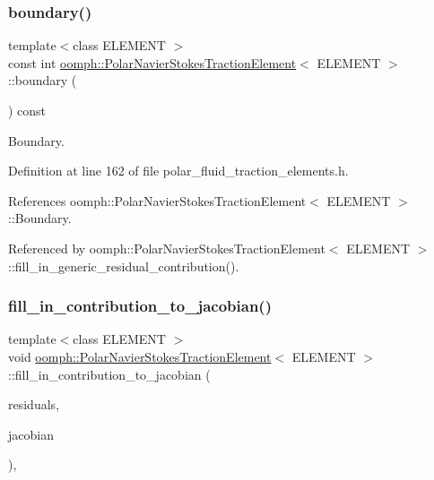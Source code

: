 \subsubsection{\texorpdfstring{boundary()}{boundary()}}
{\footnotesize\ttfamily template$<$class E\+L\+E\+M\+E\+NT $>$ \\
const int \hyperlink{classoomph_1_1PolarNavierStokesTractionElement}{oomph\+::\+Polar\+Navier\+Stokes\+Traction\+Element}$<$ E\+L\+E\+M\+E\+NT $>$\+::boundary (\begin{DoxyParamCaption}{ }\end{DoxyParamCaption}) const\hspace{0.3cm}{\ttfamily [inline]}}



Boundary. 



Definition at line 162 of file polar\+\_\+fluid\+\_\+traction\+\_\+elements.\+h.



References oomph\+::\+Polar\+Navier\+Stokes\+Traction\+Element$<$ E\+L\+E\+M\+E\+N\+T $>$\+::\+Boundary.



Referenced by oomph\+::\+Polar\+Navier\+Stokes\+Traction\+Element$<$ E\+L\+E\+M\+E\+N\+T $>$\+::fill\+\_\+in\+\_\+generic\+\_\+residual\+\_\+contribution().

\mbox{\label{classoomph_1_1PolarNavierStokesTractionElement_a4a8aea8b8278cb407348de86309e5074}} 
\subsubsection{\texorpdfstring{fill\+\_\+in\+\_\+contribution\+\_\+to\+\_\+jacobian()}{fill\_in\_contribution\_to\_jacobian()}}
{\footnotesize\ttfamily template$<$class E\+L\+E\+M\+E\+NT $>$ \\
void \hyperlink{classoomph_1_1PolarNavierStokesTractionElement}{oomph\+::\+Polar\+Navier\+Stokes\+Traction\+Element}$<$ E\+L\+E\+M\+E\+NT $>$\+::fill\+\_\+in\+\_\+contribution\+\_\+to\+\_\+jacobian (\begin{DoxyParamCaption}\item[{\hyperlink{classoomph_1_1Vector}{Vector}$<$ double $>$ \&}]{residuals,  }\item[{\hyperlink{classoomph_1_1DenseMatrix}{Dense\+Matrix}$<$ double $>$ \&}]{jacobian }\end{DoxyParamCaption})\hspace{0.3cm}{\ttfamily [inline]}, {\ttfamily [virtual]}}



